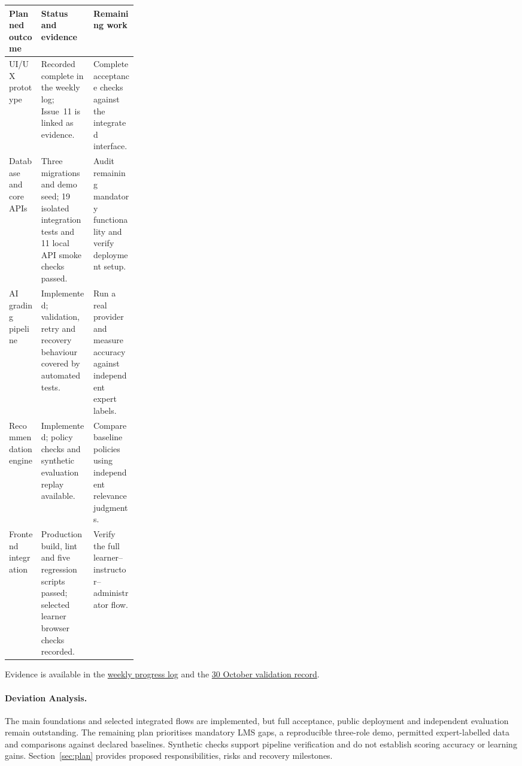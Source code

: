 \begin{center}
\begingroup
\small
\setlength{\tabcolsep}{4pt}
\renewcommand{\arraystretch}{1.1}
\begin{tabularx}{\linewidth}{@{}p{0.25\linewidth}XX@{}}
\toprule
\textbf{Planned outcome} & \textbf{Status and evidence} & \textbf{Remaining work} \\
\midrule
UI/UX prototype & Recorded complete in the weekly log; Issue~11 is linked as evidence. & Complete acceptance checks against the integrated interface. \\
Database and core APIs & Three migrations and demo seed; 19 isolated integration tests and 11 local API smoke checks passed. & Audit remaining mandatory functionality and verify deployment setup. \\
AI grading pipeline & Implemented; validation, retry and recovery behaviour covered by automated tests. & Run a real provider and measure accuracy against independent expert labels. \\
Recommendation engine & Implemented; policy checks and synthetic evaluation replay available. & Compare baseline policies using independent relevance judgments. \\
Frontend integration & Production build, lint and five regression scripts passed; selected learner browser checks recorded. & Verify the full learner--instructor--administrator flow. \\
\bottomrule
\end{tabularx}
\endgroup
\end{center}

Evidence is available in the
\href{https://docs.google.com/document/d/1tDeQUFaP0ttOuAwh-ihx1wdaSiAIPZxqVrUM3X8RfFQ/edit}{weekly progress log}
and the
\href{https://github.com/huyho44/IELTS-Evaluator-Pro/blob/dbbe536/docs/validation/MVP-checks-2026-10-30.md}{30 October validation record}.

\paragraph{Deviation Analysis.}
The main foundations and selected integrated flows are implemented, but full
acceptance, public deployment and independent evaluation remain outstanding.
The remaining plan prioritises mandatory LMS gaps, a reproducible three-role
demo, permitted expert-labelled data and comparisons against declared
baselines. Synthetic checks support pipeline verification and do not
establish scoring accuracy or learning gains. Section~\ref{sec:plan}
provides proposed responsibilities, risks and recovery milestones.

